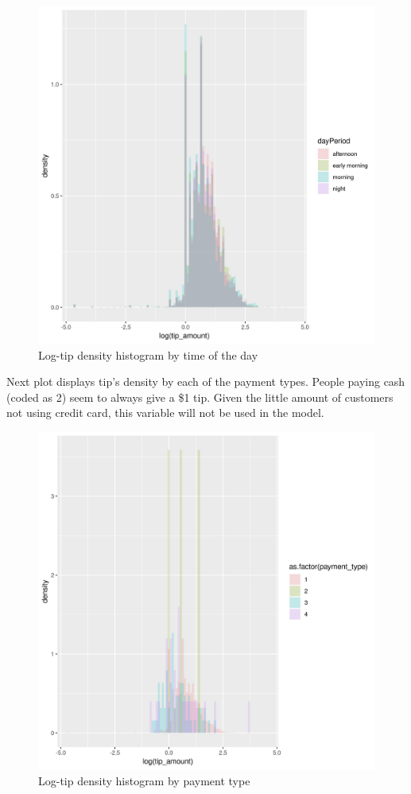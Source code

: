 \documentclass[11pt]{article}
\begin{document}
\begin{figure}[htbp]
\centering
\includegraphics[width=.9\linewidth]{./plots/dayPeriodTipDensityHist.jpg}
\caption{\label{fig:org0f50b2f}
Log-tip density histogram by time of the day}
\end{figure}

Next plot displays tip's density by each of the payment types.
People paying cash (coded as 2) seem to always give a \$1 tip.
Given the little amount of customers not using credit card, this
variable will not be used in the model.

\begin{figure}[htbp]
\centering
\includegraphics[width=.9\linewidth]{./plots/paymentTipDensityHist.jpg}
\caption{\label{fig:org81c73ef}
Log-tip density histogram by payment type}
\end{figure}
\end{document}
